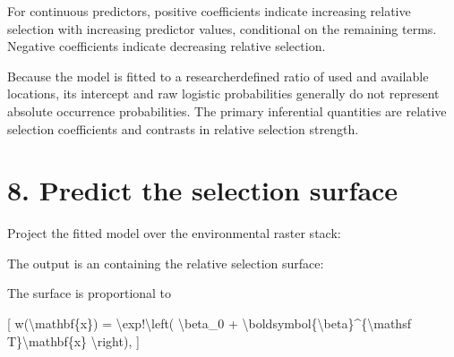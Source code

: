 \documentclass[letterpaper,10pt,english]{sphinxmanual}
\begin{document}
\sphinxAtStartPar
For continuous predictors, positive coefficients indicate increasing relative selection with increasing predictor values, conditional on the remaining terms. Negative coefficients indicate decreasing relative selection.

\sphinxAtStartPar
Because the model is fitted to a researcher\sphinxhyphen{}defined ratio of used and available locations, its intercept and raw logistic probabilities generally do not represent absolute occurrence probabilities. The primary inferential quantities are relative selection coefficients and contrasts in relative selection strength.


\section{8. Predict the selection surface}
\label{\detokenize{getting_started:predict-the-selection-surface}}
\sphinxAtStartPar
Project the fitted model over the environmental raster stack:

\begin{sphinxVerbatim}[commandchars=\\\{\}]
  

\end{sphinxVerbatim}

\sphinxAtStartPar
The output is an  containing the relative selection surface:

\begin{sphinxVerbatim}[commandchars=\\\{\}]
     
\end{sphinxVerbatim}

\sphinxAtStartPar
The surface is proportional to

\sphinxAtStartPar
{[}
w(\textbackslash{}mathbf\{x\}) = \textbackslash{}exp!\textbackslash{}left(
\textbackslash{}beta\_0 + \textbackslash{}boldsymbol\{\textbackslash{}beta\}\textasciicircum{}\{\textbackslash{}mathsf T\}\textbackslash{}mathbf\{x\}
\textbackslash{}right),
{]}
\end{document}
